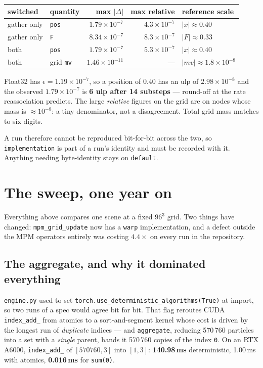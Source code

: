 \documentclass[11pt,a4paper]{article}
\newcommand{\code}[1]{\texttt{\small #1}}
\newcommand{\gd}[1]{\textcolor{good}{\textbf{#1}}}
\newcommand{\bd}[1]{\textcolor{bad}{\textbf{#1}}}
\begin{document}
\begin{center}
\footnotesize
\begin{tabular}{@{}llrrl@{}}
\toprule
switched & quantity & max $|\Delta|$ & max relative & reference scale \\
\midrule
gather only  & \code{pos} & $1.79\times10^{-7}$ & $4.3\times10^{-7}$ & $|x|\approx0.40$ \\
gather only  & \code{F}   & $8.34\times10^{-7}$ & $8.3\times10^{-7}$ & $|F|\approx0.33$ \\
both         & \code{pos} & $1.79\times10^{-7}$ & $5.3\times10^{-7}$ & $|x|\approx0.40$ \\
both         & grid \code{mv} & $1.46\times10^{-11}$ & --- & $|mv|\approx1.8\times10^{-8}$ \\
\bottomrule
\end{tabular}
\end{center}

\noindent
Float32 has $\epsilon=1.19\times10^{-7}$, so a position of $0.40$ has an ulp of $2.98\times10^{-8}$
and the observed $1.79\times10^{-7}$ is \gd{6 ulp after 14 substeps} --- round-off at the rate
reassociation predicts. The large \emph{relative} figures on the grid are on nodes whose mass is
$\approx10^{-8}$: a tiny denominator, not a disagreement. Total grid mass matches to six digits.

A run therefore cannot be reproduced bit-for-bit across the two, so \code{implementation} is part of
a run's identity and must be recorded with it. Anything needing byte-identity stays on
\code{default}.

\section{The sweep, one year on}

Everything above compares one scene at a fixed $96^3$ grid. Two things have changed:
\code{mpm\_grid\_update} now has a \code{warp} implementation, and a defect outside the MPM operators
entirely was costing $4.4\times$ on every run in the repository.

\subsection{The aggregate, and why it dominated everything}

\code{engine.py} used to set \code{torch.use\_deterministic\_algorithms(True)} at import, so two runs
of a spec would agree bit for bit. That flag reroutes CUDA \code{index\_add\_} from atomics to a
sort-and-segment kernel whose cost is driven by the longest run of \emph{duplicate} indices --- and
\code{aggregate}, reducing 570\,760 particles into a set with a \emph{single} parent, hands it
570\,760 copies of the index \code{0}. On an RTX A6000, \code{index\_add\_} of $[570760,3]$ into
$[1,3]$: \bd{140.98\,ms} deterministic, 1.00\,ms with atomics, \gd{0.016\,ms} for \code{sum(0)}.
\end{document}
